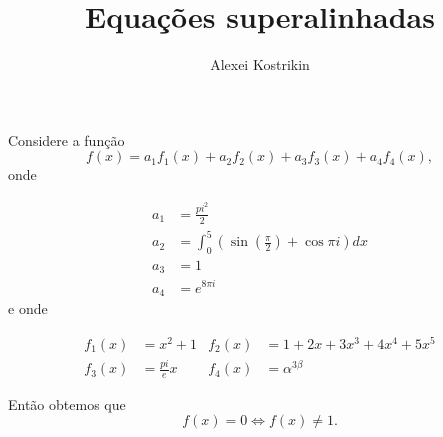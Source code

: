 \documentclass[12pt, a4paper]{article}
\title{Equações superalinhadas}
\author{Alexei Kostrikin}
\date{}
\begin{document}
  \maketitle

  Considere a função
  \[
    f(x) = a_1 f_1(x) + a_2 f_2(x) + a_3 f_3(x) + a_4 f_4(x),
  \]
  onde

  \begin{align}
    a_1 &= \frac{pi^2}{2}\\
    a_2 &= \int_0^5 \left( \sin\left(\frac{\pi}{2}\right) + \cos{\pi i} \right) dx\\
    a_3 &= 1\\
    a_4 &= e^{8\pi i}
  \end{align}
  e onde

  \begin{align*}
    f_1(x) &= x^2 + 1
    & f_2(x) &= 1+2x+3x^3+4x^4+5x^5\\
    f_3(x) &= \frac{pi}{e}x
    & f_4(x) &= \alpha^{3\beta}
  \end{align*}

  Então obtemos que
  \[
    f(x) = 0 \iff f(x) \neq 1.
  \]
\end{document}

